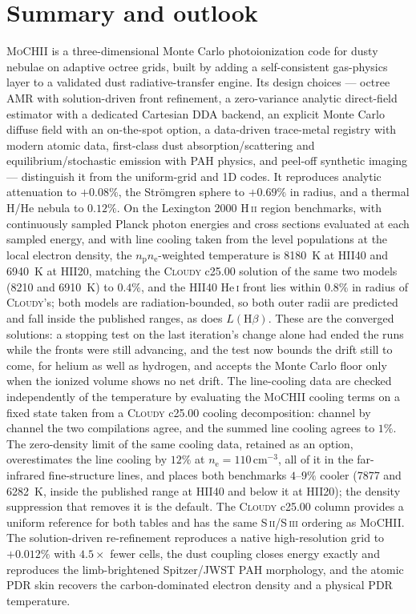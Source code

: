 \documentclass[twocolumn,linenumbers]{aastex702}
\newcommand{\MoCHII}{\textsc{MoCHII}}
\newcommand{\HII}{H\,\textsc{ii}}
\newcommand{\HeI}{He\,\textsc{i}}
\newcommand{\nelec}{n_{\mathrm{e}}}
\begin{document}
\section{Summary and outlook}
\label{sec:summary}

\MoCHII{} is a three-dimensional Monte Carlo photoionization code for dusty
nebulae on adaptive octree grids, built by adding a self-consistent
gas-physics layer to a validated dust radiative-transfer engine.  Its
design choices --- octree AMR with solution-driven front refinement, a
zero-variance analytic direct-field estimator with a dedicated Cartesian
DDA backend, an explicit Monte Carlo diffuse field with an on-the-spot
option, a
data-driven trace-metal registry with modern atomic data, first-class dust
absorption/scattering and equilibrium/stochastic emission with PAH physics,
and peel-off synthetic imaging --- distinguish it from the uniform-grid and
1D codes.  It reproduces analytic attenuation to $+0.08\%$, the Str\"omgren
sphere to $+0.69\%$ in radius, and a thermal H/He nebula to $0.12\%$.  On the
Lexington 2000 \HII{} region benchmarks, with continuously sampled Planck
photon energies and cross sections evaluated at each sampled energy, and
with line cooling taken from the level populations at the local electron
density, the
$n_{\mathrm{p}}n_{\mathrm{e}}$-weighted temperature is 8180~K at HII40 and
6940~K at HII20, matching the \textsc{Cloudy} c25.00 solution of the same
two models (8210 and 6910~K) to $0.4\%$, and the HII40 \HeI{} front lies
within $0.8\%$ in radius of \textsc{Cloudy}'s; both models are
radiation-bounded, so both outer radii are predicted and fall inside the
published ranges, as does $L(\mathrm{H}\beta)$.  These are the converged
solutions: a stopping test on the last iteration's change alone had ended
the runs while the fronts were still advancing, and the test now bounds the
drift still to come, for helium as well as hydrogen, and accepts the Monte
Carlo floor only when the ionized volume shows no net drift.  The
line-cooling data are checked independently of the temperature by evaluating
the \MoCHII{} cooling terms on a fixed state taken from a \textsc{Cloudy}
c25.00 cooling decomposition: channel by channel the two compilations agree,
and the summed line cooling agrees to $1\%$.  The zero-density limit of the
same cooling data, retained as an option, overestimates the line cooling
by $12\%$ at $\nelec = 110\,\mathrm{cm^{-3}}$, all of it in the far-infrared
fine-structure lines, and places both
benchmarks $4$--$9\%$ cooler (7877 and 6282~K, inside the published range at
HII40 and below it at HII20); the density suppression that removes it is the
default.
The \textsc{Cloudy} c25.00 column provides a uniform reference for both
tables and has the same S\,\textsc{ii}/S\,\textsc{iii} ordering as
\MoCHII{}.
The solution-driven
re-refinement reproduces a native high-resolution grid to $+0.012\%$ with
$4.5\times$ fewer cells, the dust coupling closes energy exactly and
reproduces the limb-brightened Spitzer/JWST PAH morphology, and the
atomic PDR skin
recovers the carbon-dominated electron density and a physical PDR
temperature.
\end{document}

